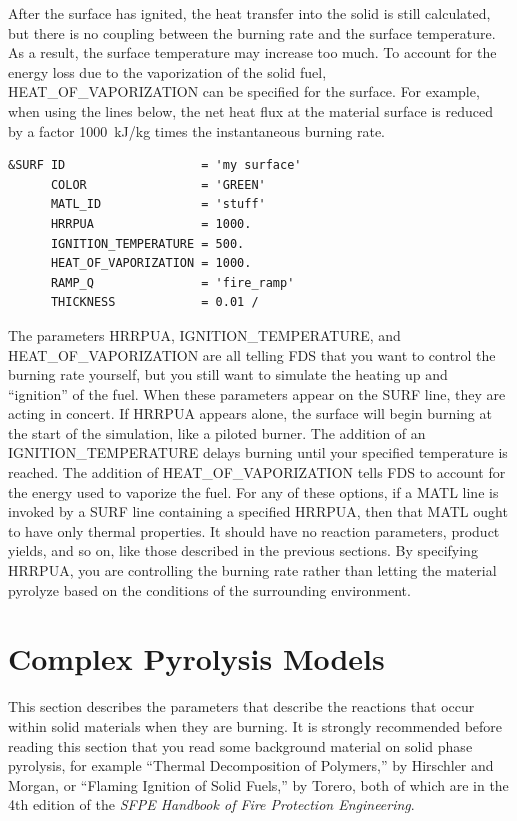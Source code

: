 \documentclass[11pt]{book}
\begin{document}
After the surface has ignited, the heat transfer into the solid is
still calculated, but there is no coupling between the burning rate
and the surface temperature. As a result, the surface temperature may
increase too much. To account for the energy loss due to the
vaporization of the solid fuel, {\ct HEAT\_OF\_VAPORIZATION} can be
specified for the surface. For example, when using the lines below,
the net heat flux at the material surface is reduced by a factor
1000~kJ/kg times the instantaneous burning rate.
\begin{lstlisting}
&SURF ID                   = 'my surface'
      COLOR                = 'GREEN'
      MATL_ID              = 'stuff'
      HRRPUA               = 1000.
      IGNITION_TEMPERATURE = 500.
      HEAT_OF_VAPORIZATION = 1000.
      RAMP_Q               = 'fire_ramp'
      THICKNESS            = 0.01 /
\end{lstlisting}
The parameters {\ct HRRPUA}, {\ct IGNITION\_TEMPERATURE}, and {\ct HEAT\_OF\_VAPORIZATION} are all telling FDS that you want to control the
burning rate yourself, but you still want to simulate the heating up and ``ignition'' of the fuel. When these parameters appear on the {\ct SURF} line, they
are acting in concert. If {\ct HRRPUA} appears alone, the surface will begin burning at the start of the simulation, like a piloted burner. The addition of
an {\ct IGNITION\_TEMPERATURE} delays burning until your specified temperature is reached. The addition of {\ct HEAT\_OF\_VAPORIZATION}
tells FDS to account for the energy used to vaporize the fuel. For any of these options, if a {\ct MATL} line is invoked by a {\ct SURF} line containing
a specified {\ct HRRPUA}, then that {\ct MATL} ought to have only thermal properties. It should have no reaction parameters, product yields, and so on, like
those described in the previous sections. By specifying {\ct HRRPUA}, you are controlling the burning rate rather than letting the material pyrolyze based on
the conditions of the surrounding environment.






\section{Complex Pyrolysis Models}
\label{info:solid_pyrolysis}

This section describes the parameters that describe the reactions that occur within solid
materials when they are burning. It is strongly recommended before reading this section that you read some background material on
solid phase pyrolysis, for example ``Thermal Decomposition of Polymers,'' by Hirschler and Morgan, or
``Flaming Ignition of Solid Fuels,'' by Torero, both of which are in the 4th edition of the
{\em SFPE Handbook of Fire Protection Engineering}.
\end{document}
